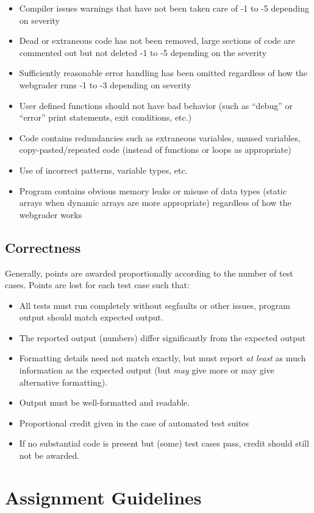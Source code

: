 \documentclass[12pt]{scrartcl}
\begin{document}
\begin{itemize}
  \item Compiler issues warnings that have not been taken care of -1 to -5 depending on severity
  \item Dead or extraneous code has not been removed, large sections of code are commented out but not deleted -1 to -5 depending on the severity
  \item Sufficiently reasonable error handling has been omitted regardless of how the webgrader runs -1 to -3 depending on severity
  \item User defined functions should not have bad behavior (such as ``debug'' or ``error'' print statements, exit conditions, etc.)
  \item Code contains redundancies such as extraneous variables, unused variables, copy-pasted/repeated code (instead of functions or loops as appropriate)
  \item Use of incorrect patterns, variable types, etc.
  \item Program contains obvious memory leaks or misuse of data types (static arrays when dynamic arrays are more appropriate) regardless of how the webgrader works
\end{itemize}

\subsection*{Correctness}

Generally, points are awarded proportionally according to the number of test cases.
Points are lost for each test case such that:

\begin{itemize}
  \item All tests must run completely without segfaults or other issues, program
  output should match expected output.
  \item The reported output (numbers) differ significantly from the expected output
  \item Formatting details need not match exactly, but must report \emph{at least} as much information as the expected output (but \emph{may} give more or may give alternative formatting).
  \item Output must be well-formatted and readable.
  \item Proportional credit given in the case of automated test suites
  \item If no substantial code is present but (some) test cases pass, credit should still not be awarded.
\end{itemize}

\newpage

\section*{Assignment Guidelines}
\end{document}

